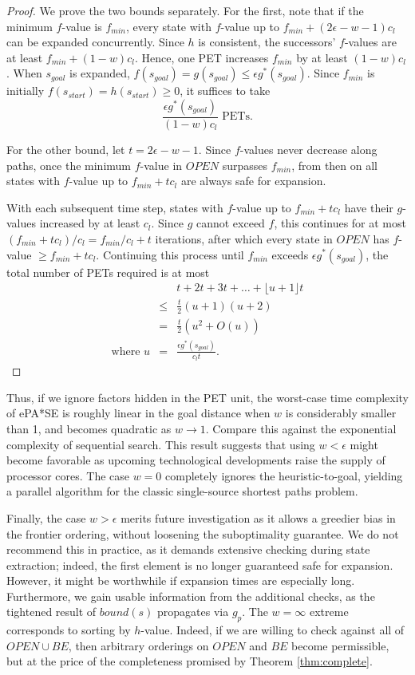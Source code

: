 \documentclass[letterpaper]{article}
\begin{document}
\begin{proof}
We prove the two bounds separately. For the first, note that if the minimum $f$-value is $f_{min}$, every state with $f$-value up to $f_{min} + (2\epsilon-w-1)c_l$ can be expanded concurrently. Since $h$ is consistent, the successors' $f$-values are at least $f_{min} + (1-w)c_l$. Hence, one PET increases $f_{min}$ by at least $(1-w)c_l$. When $s_{goal}$ is expanded, $f(s_{goal}) = g(s_{goal}) \le \epsilon g^*(s_{goal})$. Since $f_{min}$ is initially $f(s_{start}) = h(s_{start}) \ge 0$, it suffices to take
\[\frac{\epsilon g^*(s_{goal})}{(1-w)c_l}\text{ PETs.}\]

For the other bound, let $t=2\epsilon-w-1$. Since $f$-values never decrease along paths, once the minimum $f$-value in $OPEN$ surpasses $f_{min}$, from then on all states with $f$-value up to $f_{min} + tc_l$ are always safe for expansion.

With each subsequent time step, states with $f$-value up to $f_{min} + tc_l$ have their $g$-values increased by at least $c_l$. Since $g$ cannot exceed $f$, this continues for at most $(f_{min} + tc_l) / c_l = f_{min}/c_l + t$ iterations, after which every state in $OPEN$ has $f$-value $\ge f_{min} + tc_l$. Continuing this process until $f_{min}$ exceeds $\epsilon g^*(s_{goal})$, the total number of PETs required is at most
\begin{eqnarray*}
&&t + 2t + 3t + \ldots + \lfloor u+1 \rfloor t
\\&\le& \frac t2 (u+1)(u+2)
\\&=& \frac t2 (u^2 + O(u))
\\\text{where }u &=& \frac{\epsilon g^*(s_{goal})}{c_lt}.
\end{eqnarray*}
\end{proof}

Thus, if we ignore factors hidden in the PET unit, the worst-case time complexity of ePA*SE is roughly linear in the goal distance when $w$ is considerably smaller than 1, and becomes quadratic as $w \rightarrow 1$. Compare this against the exponential complexity of sequential search. This result suggests that using $w < \epsilon$ might become favorable as upcoming technological developments raise the supply of processor cores. The case $w = 0$ completely ignores the heuristic-to-goal, yielding a parallel algorithm for the classic  single-source shortest paths problem.

Finally, the case $w > \epsilon$ merits future investigation as it allows a greedier bias in the frontier ordering, without loosening the suboptimality guarantee. We do not recommend this in practice, as it demands extensive checking during state extraction; indeed, the first element is no longer guaranteed safe for expansion. However, it might be worthwhile if expansion times are especially long. Furthermore, we gain usable information from the additional checks, as the tightened result of $bound(s)$ propagates via $g_p$. The $w = \infty$ extreme corresponds to sorting by $h$-value. Indeed, if we are willing to check against all of $OPEN\cup BE$, then arbitrary orderings on $OPEN$ and $BE$ become permissible, but at the price of the completeness promised by Theorem \ref{thm:complete}.
\end{document}
